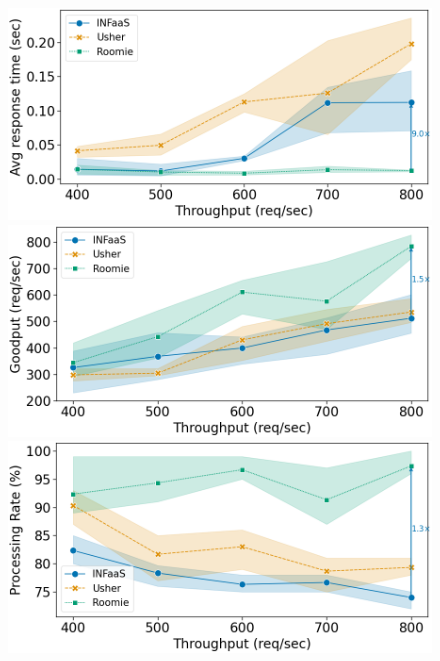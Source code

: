 \begin{figure}
	\begin{minipage}[t]{.24\textwidth}
		\centering
		\includegraphics[width=\linewidth]{chapters/roomie/images/JetsonNano/synthetic-all-models/response_time_line.png}
	\end{minipage}
	\hfill
	\begin{minipage}[t]{.24\textwidth}
		\centering
		\includegraphics[width=\textwidth]{chapters/roomie/images/JetsonNano/synthetic-all-models/goodput_line.png}
	\end{minipage}
	\hfill
	\begin{minipage}[t]{.24\textwidth}
		\centering
		\includegraphics[width=\linewidth]{chapters/roomie/images/JetsonNano/synthetic-all-models/normalized_line.png}

\end{minipage}
\end{figure}
